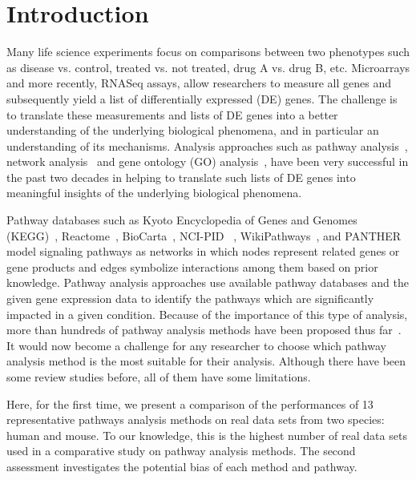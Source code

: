 \section{Introduction}
\label{chap:Introduction}


Many life science experiments focus on comparisons between two phenotypes such as disease vs. control, treated vs. not treated, drug A vs. drug B, etc. Microarrays and more recently, RNASeq assays, allow researchers to measure all genes and subsequently  yield a list of differentially expressed (DE) genes. The challenge is to translate these measurements and lists of DE genes into a better understanding of the underlying biological phenomena, and in particular an understanding of its mechanisms. Analysis approaches such as pathway analysis~\cite{DraghiciOntologicalToolsReview:2005,Khatri:2012, mitrea2013methods, tarca2013comparison, nguyen2018network, ihnatova2018critical, nguyen2019identifying}, network analysis~\cite{mitra2013integrative} and gene ontology (GO) analysis~\cite{DraghiciOntologicalToolsReview:2005,Rhee:2008}, have been very successful in the past two decades in helping to translate such lists of DE genes into meaningful insights of the underlying biological phenomena. 

Pathway databases such as Kyoto Encyclopedia of Genes and Genomes (KEGG)~\cite{Kanehisa:2000}, Reactome~\cite{croft2014reactome}, BioCarta~\cite{BioCartaWWW}, NCI-PID ~\cite{Schaefer:2009}, WikiPathways~\cite{pico2008wikipathways}, and PANTHER~\cite{thomas2003panther} model signaling pathways as networks in which nodes represent related genes or gene products and edges symbolize interactions among them based on prior knowledge. 
Pathway analysis approaches use available pathway databases and the given gene expression data to identify the pathways which are significantly impacted in a given condition. 
Because of the importance of this type of analysis, more than hundreds of pathway analysis methods have been proposed thus far~\cite{DraghiciOntologicalToolsReview:2005,Khatri:2002,mitrea2013methods}.
It would now become a challenge for any researcher to choose which pathway analysis method is the most suitable for their analysis. 
Although there have been some review studies before, all of them have some limitations.

Here, for the first time, we present a comparison of the performances of 13 representative pathways analysis methods on  real data sets from two species: human and mouse. 
To our knowledge, this is the highest number of real data sets used in a comparative study on pathway analysis methods.
The second assessment investigates the potential bias of each method and pathway.


